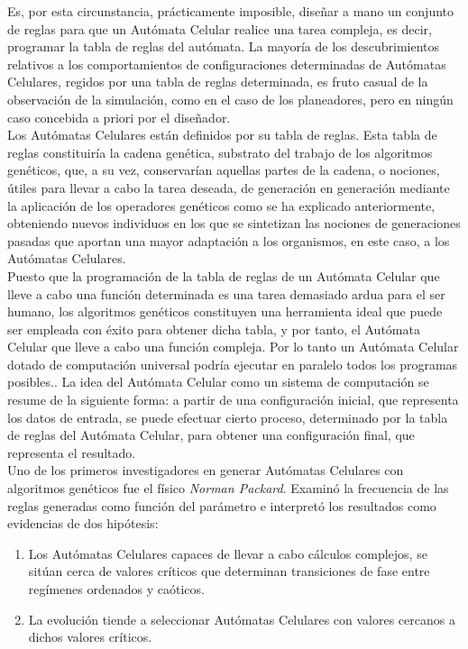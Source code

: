 Es, por esta circunstancia, prácticamente imposible, diseñar a mano un conjunto de reglas para que un Autómata Celular realice una tarea compleja, es decir, programar la tabla de reglas del autómata. La mayoría de los descubrimientos relativos a los comportamientos de configuraciones determinadas de Autómatas Celulares, regidos por una tabla de reglas determinada, es fruto casual de la observación de la simulación, como en el caso de los planeadores, pero en ningún caso concebida a priori por el diseñador.\\

Los Autómatas Celulares están definidos por su tabla de reglas. Esta tabla de reglas constituiría la cadena genética, substrato del trabajo de los algoritmos genéticos, que, a su vez, conservarían aquellas partes de la cadena, o nociones, útiles para llevar a cabo la tarea deseada, de generación en generación mediante la aplicación de los operadores genéticos como se ha explicado anteriormente, obteniendo nuevos individuos en los que se sintetizan las nociones de generaciones pasadas que aportan una mayor adaptación a los organismos, en este caso, a los Autómatas Celulares.\\

Puesto que la programación de la tabla de reglas de un Autómata Celular que lleve a cabo una función determinada es una tarea demasiado ardua para el ser humano, los algoritmos genéticos constituyen una herramienta ideal que puede ser empleada con éxito para obtener dicha tabla, y por tanto, el Autómata Celular que lleve a cabo una función compleja. Por lo tanto un Autómata Celular dotado de computación universal podría ejecutar en paralelo todos los programas posibles.. La idea del Autómata Celular como un sistema de computación se resume de la siguiente forma: a partir de una configuración inicial, que representa los datos de entrada, se puede efectuar cierto proceso, determinado por la tabla de reglas del Autómata Celular, para obtener una configuración final, que representa el resultado.\\

Uno de los primeros investigadores en generar Autómatas Celulares con algoritmos genéticos fue el físico \textit{Norman Packard}. Examinó la frecuencia de las reglas generadas como función del parámetro e interpretó los resultados como evidencias de dos hipótesis:
\begin{enumerate}
\item Los Autómatas Celulares capaces de llevar a cabo cálculos complejos, se sitúan cerca de valores críticos que determinan transiciones de fase entre regímenes ordenados y caóticos.
\newpage
\item La evolución tiende a seleccionar Autómatas Celulares con valores cercanos a dichos valores críticos.
\end{enumerate}

